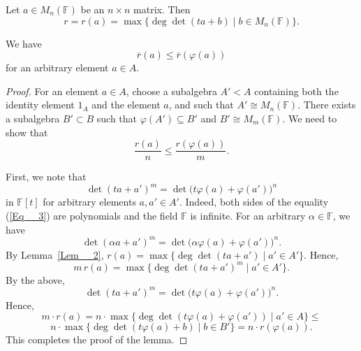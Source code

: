 \documentclass[10pt,a4paper]{amsart}
\begin{document}
		\begin{lemma}\label{Lem__2}
		Let $a \in M_n(\mathbb{F})$ be an $n\times n$  matrix.
		Then
		\[
		r = r(a) = \max \{ \deg \det (ta + b) \mid b \in M_n(\mathbb{F}) \}.
		\] \end{lemma}

		\begin{lemma}\label{Lem__3}		We have 
				\begin{equation}\label{Eq__2} \overline{r}(a) \le \overline{r}(\varphi(a)) 	\end{equation}
					 for an arbitrary element $a \in A$.	\end{lemma}

		\begin{proof} 		For an element $a \in A$, choose a subalgebra $A' < A$ containing  both the identity element $1_A$ and the element $ a$, and such that  $A' \cong M_n(\mathbb{F})$.	There exists a subalgebra $B' \subset B$ such that $\varphi(A') \subseteq B'$ and $B' \cong M_m(\mathbb{F})$.
		We need to show that
		\[
		\frac{r(a)}{n} \le \frac{r(\varphi(a))}{m}.
		\]
		
		First, we note that
		\begin{equation}\label{Eq__3}
		\det(t a + a')^m = \det \bigl( t \varphi(a) + \varphi(a') \bigr)^n
			\end{equation}
		in $\mathbb{F}[t]$ for arbitrary elements $a, a' \in A'$.
		Indeed, both sides of the equality (\ref{Eq__3}) are polynomials and the field $\mathbb{F}$ is infinite. For an arbitrary $\alpha \in \mathbb{F}$, we have
		\[
		\det(\alpha a + a')^m = \det \bigl( \alpha \varphi(a) + \varphi(a') \bigr)^n.
		\]
		By Lemma~\ref{Lem__2}, 	$r(a) = \max \{ \deg \det (t a + a') \mid a' \in A' \}.$	Hence,
		\[
		m \, r(a) = \max \{ \deg \det (t a + a')^m \mid a' \in A' \}.
		\]
		By the above,
		\[
		\det (t a + a')^m = \det \bigl( t \varphi(a) + \varphi(a') \bigr)^n.
		\] 		Hence,
		\[
		m\cdot r(a) 
		= n \cdot \max \{ \deg \det (t \varphi(a) + \varphi(a')) 
		\mid a' \in A \}
		\le \] \[  n \cdot \max \{ \deg \det (t \varphi(a) + b) 
		\mid b \in B' \} 
		= n \cdot  r(\varphi(a)).
		\]
		This completes the proof of the lemma. \end{proof}
\end{document}
